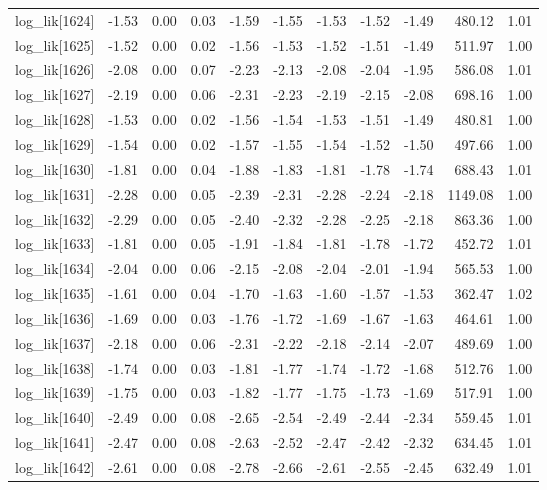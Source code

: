 \begin{table}[ht]
\begin{tabular}{rrrrrrrrrrr}
  log\_lik[1624] & -1.53 & 0.00 & 0.03 & -1.59 & -1.55 & -1.53 & -1.52 & -1.49 & 480.12 & 1.01 \\ 
  log\_lik[1625] & -1.52 & 0.00 & 0.02 & -1.56 & -1.53 & -1.52 & -1.51 & -1.49 & 511.97 & 1.00 \\ 
  log\_lik[1626] & -2.08 & 0.00 & 0.07 & -2.23 & -2.13 & -2.08 & -2.04 & -1.95 & 586.08 & 1.01 \\ 
  log\_lik[1627] & -2.19 & 0.00 & 0.06 & -2.31 & -2.23 & -2.19 & -2.15 & -2.08 & 698.16 & 1.00 \\ 
  log\_lik[1628] & -1.53 & 0.00 & 0.02 & -1.56 & -1.54 & -1.53 & -1.51 & -1.49 & 480.81 & 1.00 \\ 
  log\_lik[1629] & -1.54 & 0.00 & 0.02 & -1.57 & -1.55 & -1.54 & -1.52 & -1.50 & 497.66 & 1.00 \\ 
  log\_lik[1630] & -1.81 & 0.00 & 0.04 & -1.88 & -1.83 & -1.81 & -1.78 & -1.74 & 688.43 & 1.01 \\ 
  log\_lik[1631] & -2.28 & 0.00 & 0.05 & -2.39 & -2.31 & -2.28 & -2.24 & -2.18 & 1149.08 & 1.00 \\ 
  log\_lik[1632] & -2.29 & 0.00 & 0.05 & -2.40 & -2.32 & -2.28 & -2.25 & -2.18 & 863.36 & 1.00 \\ 
  log\_lik[1633] & -1.81 & 0.00 & 0.05 & -1.91 & -1.84 & -1.81 & -1.78 & -1.72 & 452.72 & 1.01 \\ 
  log\_lik[1634] & -2.04 & 0.00 & 0.06 & -2.15 & -2.08 & -2.04 & -2.01 & -1.94 & 565.53 & 1.00 \\ 
  log\_lik[1635] & -1.61 & 0.00 & 0.04 & -1.70 & -1.63 & -1.60 & -1.57 & -1.53 & 362.47 & 1.02 \\ 
  log\_lik[1636] & -1.69 & 0.00 & 0.03 & -1.76 & -1.72 & -1.69 & -1.67 & -1.63 & 464.61 & 1.00 \\ 
  log\_lik[1637] & -2.18 & 0.00 & 0.06 & -2.31 & -2.22 & -2.18 & -2.14 & -2.07 & 489.69 & 1.00 \\ 
  log\_lik[1638] & -1.74 & 0.00 & 0.03 & -1.81 & -1.77 & -1.74 & -1.72 & -1.68 & 512.76 & 1.00 \\ 
  log\_lik[1639] & -1.75 & 0.00 & 0.03 & -1.82 & -1.77 & -1.75 & -1.73 & -1.69 & 517.91 & 1.00 \\ 
  log\_lik[1640] & -2.49 & 0.00 & 0.08 & -2.65 & -2.54 & -2.49 & -2.44 & -2.34 & 559.45 & 1.01 \\ 
  log\_lik[1641] & -2.47 & 0.00 & 0.08 & -2.63 & -2.52 & -2.47 & -2.42 & -2.32 & 634.45 & 1.01 \\ 
  log\_lik[1642] & -2.61 & 0.00 & 0.08 & -2.78 & -2.66 & -2.61 & -2.55 & -2.45 & 632.49 & 1.01 \\ 

\end{tabular}
\end{table}
